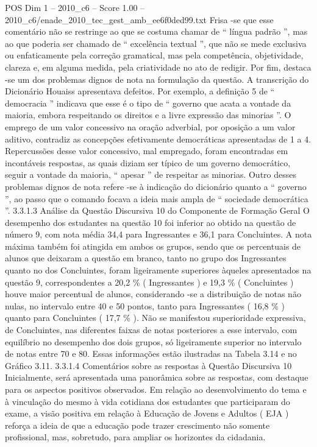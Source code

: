 \begin{textsample}{POS Dim 1 – 2010\_c6 – Score 1.00 – 2010\_c6/enade\_2010\_tec\_gest\_amb\_ee6f0ded99.txt}
Frisa -se que esse comentário não se restringe ao que se costuma chamar de “ língua padrão ”, mas ao que poderia ser chamado de “ excelência textual ”, que não se mede exclusiva ou enfaticamente pela correção gramatical, mas pela competência, objetividade, clareza e, em alguma medida, pela criatividade no ato de redigir.
Por fim, destaca -se um dos problemas dignos de nota na formulação da questão.
A transcrição do Dicionário Houaiss apresentava defeitos.
Por exemplo, a definição 5 de “ democracia ” indicava que esse é o tipo de “ governo que acata a vontade da maioria, embora respeitando os direitos e a livre expressão das minorias ”.
O emprego de um valor concessivo na oração adverbial, por oposição a um valor aditivo, contradiz as concepções efetivamente democráticas apresentadas de 1 a 4.
Repercussões desse valor concessivo, mal empregado, foram encontradas em incontáveis respostas, as quais diziam ser típico de um governo democrático, seguir a vontade da maioria, “ apesar ” de respeitar as minorias.
Outro desses problemas dignos de nota refere -se à indicação do dicionário quanto a “ governo ”, ao passo que o comando focava a ideia mais ampla de “ sociedade democrática ”. 3.3.1.3 Análise da Questão Discursiva 10 do Componente de Formação Geral O desempenho dos estudantes na questão 10 foi inferior ao obtido na questão de número 9, com nota média 34,4 para Ingressantes e 36,1 para Concluintes.
A nota máxima também foi atingida em ambos os grupos, sendo que os percentuais de alunos que deixaram a questão em branco, tanto no grupo dos Ingressantes quanto no dos Concluintes, foram ligeiramente superiores àqueles apresentados na questão 9, correspondentes a 20,2 \% ( Ingressantes ) e 19,3 \% ( Concluintes ) houve maior percentual de alunos, considerando -se a distribuição de notas não nulas, no intervalo entre 40 e 50 pontos, tanto para Ingressantes ( 16,8 \% ) quanto para Concluintes ( 17,7 \% ).
Não se manifestou superioridade expressiva, de Concluintes, nas diferentes faixas de notas posteriores a esse intervalo, com equilíbrio no desempenho dos dois grupos, só ligeiramente superior no intervalo de notas entre 70 e 80.
Essas informações estão ilustradas na Tabela 3.14 e no Gráfico 3.11. 3.3.1.4 Comentários sobre as respostas à Questão Discursiva 10 Inicialmente, será apresentada uma panorâmica sobre as respostas, com destaque para os aspectos positivos observados.
Em relação ao desenvolvimento do tema e à vinculação do mesmo à vida cotidiana dos estudantes que participaram do exame, a visão positiva em relação à Educação de Jovens e Adultos ( EJA ) reforça a ideia de que a educação pode trazer crescimento não somente profissional, mas, sobretudo, para ampliar os horizontes da cidadania.

\end{textsample}
